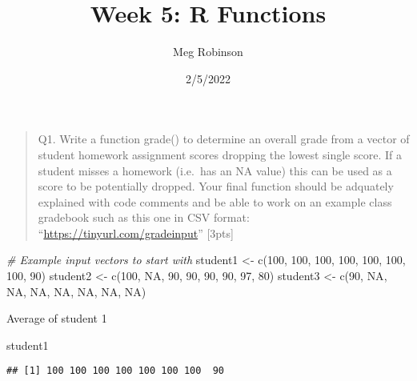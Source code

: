 \documentclass[
]{article}
\title{Week 5: R Functions}
\author{Meg Robinson}
\date{2/5/2022}
\newenvironment{Shaded}{\begin{snugshade}}{\end{snugshade}}
\newcommand{\CommentTok}[1]{\textcolor[rgb]{0.56,0.35,0.01}{\textit{#1}}}
\newcommand{\ConstantTok}[1]{\textcolor[rgb]{0.00,0.00,0.00}{#1}}
\newcommand{\DecValTok}[1]{\textcolor[rgb]{0.00,0.00,0.81}{#1}}
\newcommand{\FunctionTok}[1]{\textcolor[rgb]{0.00,0.00,0.00}{#1}}
\newcommand{\NormalTok}[1]{#1}
\newcommand{\OtherTok}[1]{\textcolor[rgb]{0.56,0.35,0.01}{#1}}
\begin{document}
\maketitle

\begin{quote}
Q1. Write a function grade() to determine an overall grade from a vector
of student homework assignment scores dropping the lowest single score.
If a student misses a homework (i.e.~has an NA value) this can be used
as a score to be potentially dropped. Your final function should be
adquately explained with code comments and be able to work on an example
class gradebook such as this one in CSV format:
``\url{https://tinyurl.com/gradeinput}'' {[}3pts{]}
\end{quote}

\begin{Shaded}
\begin{Highlighting}[]
\CommentTok{\# Example input vectors to start with}
\NormalTok{student1 }\OtherTok{\textless{}{-}} \FunctionTok{c}\NormalTok{(}\DecValTok{100}\NormalTok{, }\DecValTok{100}\NormalTok{, }\DecValTok{100}\NormalTok{, }\DecValTok{100}\NormalTok{, }\DecValTok{100}\NormalTok{, }\DecValTok{100}\NormalTok{, }\DecValTok{100}\NormalTok{, }\DecValTok{90}\NormalTok{)}
\NormalTok{student2 }\OtherTok{\textless{}{-}} \FunctionTok{c}\NormalTok{(}\DecValTok{100}\NormalTok{, }\ConstantTok{NA}\NormalTok{, }\DecValTok{90}\NormalTok{, }\DecValTok{90}\NormalTok{, }\DecValTok{90}\NormalTok{, }\DecValTok{90}\NormalTok{, }\DecValTok{97}\NormalTok{, }\DecValTok{80}\NormalTok{)}
\NormalTok{student3 }\OtherTok{\textless{}{-}} \FunctionTok{c}\NormalTok{(}\DecValTok{90}\NormalTok{, }\ConstantTok{NA}\NormalTok{, }\ConstantTok{NA}\NormalTok{, }\ConstantTok{NA}\NormalTok{, }\ConstantTok{NA}\NormalTok{, }\ConstantTok{NA}\NormalTok{, }\ConstantTok{NA}\NormalTok{, }\ConstantTok{NA}\NormalTok{)}
\end{Highlighting}
\end{Shaded}

Average of student 1

\begin{Shaded}
\begin{Highlighting}[]
\NormalTok{student1}
\end{Highlighting}
\end{Shaded}

\begin{verbatim}
## [1] 100 100 100 100 100 100 100  90
\end{verbatim}
\end{document}
